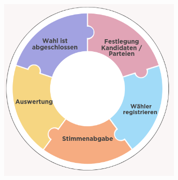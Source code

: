 \documentclass{article}  %
\begin{document}
\begin{figure}[h] %
    \centering %
    \includegraphics[width=0.8\textwidth]{election_process} %
    \label{fig:example} %
\end{figure}
\end{document}
